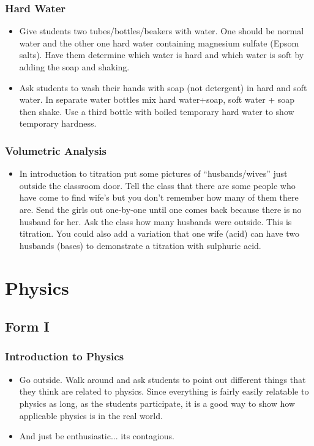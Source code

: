 \subsubsection{Hard Water}
\begin{itemize}
\item Give students two tubes/bottles/beakers with water. One should be normal water and the other one hard water containing magnesium sulfate (Epsom salts). Have them determine which water is hard and which water is soft by adding the soap and shaking.
\item Ask students to wash their hands with soap (not
detergent) in hard and soft water.  In separate water bottles mix hard
water+soap, soft water + soap then shake.  Use a third bottle with
boiled temporary hard water to show temporary hardness.
\end{itemize}

\subsubsection{Volumetric Analysis}
\begin{itemize}
\item	In introduction to titration put some pictures of ``husbands/wives'' just outside the classroom door. Tell the class that there are some people who have come to find wife's but you don't remember how many of them there are. Send the girls out one-by-one until one comes back because there is no husband for her. Ask the class how many husbands were outside. This is titration.
You could also add a variation that one wife (acid) can have two husbands (bases) to demonstrate a titration with sulphuric acid.
\end{itemize}


\section{Physics}
\subsection{Form I}
\subsubsection{Introduction to Physics}
\begin{itemize}
\item	Go outside. Walk around and ask students to point out different things that they think are related to physics. Since everything is fairly easily relatable to physics as long, as the students participate, it is a good way to show how applicable physics is in the real world. 
\item	And just be enthusiastic... its contagious. 
\end{itemize}

